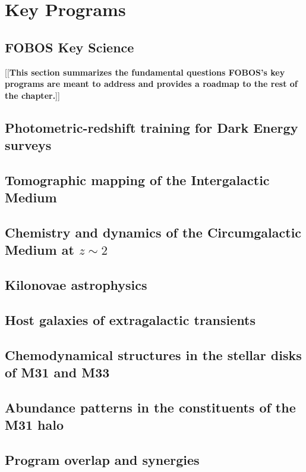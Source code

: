 \documentclass[11pt,a4paper,twoside,onecolumn,openany,final,oldfontcommands]{memoir}
\newcommand{\edit}[2][todo]{{\color{#1}[[{\bf #2}]]}}
\begin{document}
\newpage

\chapter{Key Programs}

\section{FOBOS Key Science}

\edit{This section summarizes the fundamental questions FOBOS's key programs are meant to address and provides a roadmap to the rest of the chapter.}

\section{Photometric-redshift training for Dark Energy surveys}

\section{Tomographic mapping of the Intergalactic Medium}

\section{Chemistry and dynamics of the Circumgalactic Medium at $z\sim2$}

\section{Kilonovae astrophysics}

\section{Host galaxies of extragalactic transients}

\section{Chemodynamical structures in the stellar disks of M31 and M33}

\section{Abundance patterns in the constituents of the M31 halo}

\section{Program overlap and synergies}
\end{document}
